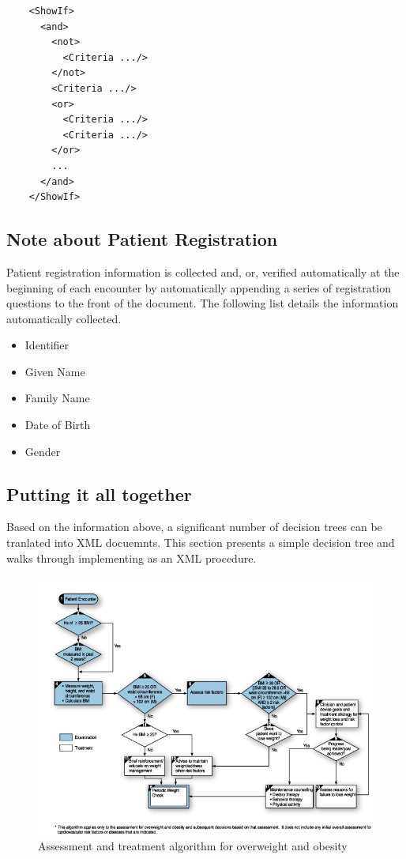 \documentclass[a4paper,10pt]{article}
\begin{document}
\begin{verbatim}
    <ShowIf>
      <and>
        <not>
          <Criteria .../>
        </not>
        <Criteria .../>
        <or>
          <Criteria .../>
          <Criteria .../>
        </or>
        ...
      </and>
    </ShowIf>
\end{verbatim}

\subsection{Note about Patient Registration}
Patient registration information is collected and, or, verified automatically at
the beginning of each encounter by automatically appending a series of 
registration questions to the front of the document. The following list
details the information automatically collected.

\begin{itemize}
 \item Identifier
 \item Given Name
 \item Family Name
 \item Date of Birth
 \item Gender
\end{itemize}

\subsection{Putting it all together}
Based on the information above, a significant number of decision trees can be 
tranlated into XML docuemnts. This section presents a simple decision tree and
walks through implementing as an XML procedure.

\noindent\begin{figure}[h]
 \includegraphics[scale=0.6,keepaspectratio=true]{Assessment_and_treatment_algorithm_for_overweight_and_obesity.png}
 \caption{Assessment and treatment algorithm for overweight and obesity}
\end{figure}
\end{document}
